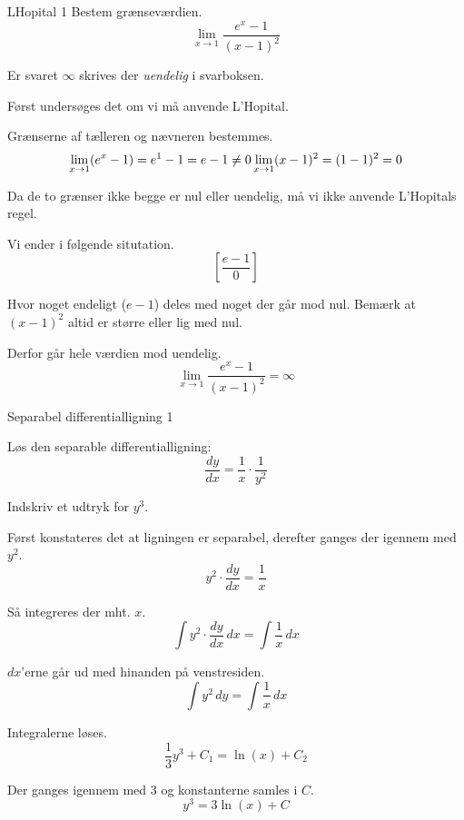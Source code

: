 \documentclass{article}
\begin{document}
\begin{exercise}{LHopital 1}
Bestem grænseværdien.
\[
\lim_{x \to 1} \frac{e^x - 1}{(x - 1)^2}
\]

Er svaret $\infty$ skrives der \emph{uendelig} i svarboksen.


\hint
Først undersøges det om vi må anvende L'Hopital.

\hint
Grænserne af tælleren og nævneren bestemmes.
\[
\lim_{x \to 1} (e^x - 1) = e^1 - 1 = e - 1 \neq 0 \\
\lim_{x \to 1} (x - 1)^2 = (1 - 1)^2 = 0
\]

\hint
Da de to grænser ikke begge er nul eller uendelig, må vi ikke anvende L'Hopitals regel.

\hint
Vi ender i følgende situtation.
\[
\left[ \frac{e - 1}{0} \right]
\]

\hint
Hvor noget endeligt ($e - 1$) deles med noget der går mod nul.
Bemærk at $(x - 1)^2$ altid er større eller lig med nul.

Derfor går hele værdien mod uendelig.
\[
\lim_{x \to 1} \frac{e^x - 1}{(x - 1)^2} = \infty
\]

\end{exercise}

\begin{exercise}{Separabel differentialligning 1}

Løs den separable differentialligning:
\[
\frac{dy}{dx} = \frac{1}{x} \cdot \frac{1}{y^2}
\]

Indskriv et udtryk for $y^3$.


\hint


Først konstateres det at ligningen er separabel, derefter
ganges der igennem med $y^2$.
\[
y^2 \cdot \frac{dy}{dx} = \frac{1}{x}
\]

\hint
Så integreres der mht. $x$.
\[
\int y^2 \cdot \frac{dy}{dx} \, dx = \int \frac{1}{x} \, dx
\]

\hint
$dx$'erne går ud med hinanden på venstresiden.
\[
\int y^2 \, dy = \int \frac{1}{x} \, dx
\]

\hint
Integralerne løses.
\[
\frac{1}{3} y^3 + C_1 = \ln(x) + C_2
\]

\hint
Der ganges igennem med 3 og konstanterne samles i $C$.
\[
y^3 = 3 \ln(x) + C
\]

\end{exercise}
\end{document}
